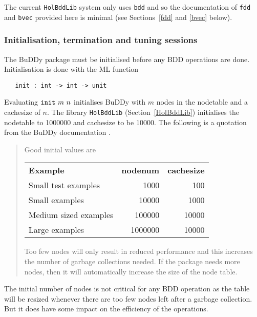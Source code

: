\documentclass[12pt]{book}
\renewcommand{\t}[1]{\mbox{\tt #1}}
\newcommand{\Buddy}{BuDDy{}}
\newcommand\HolBuddy{\texttt{HolBddLib}{}}
\begin{document}
The current \HolBuddy{} system only uses \t{bdd} and so
the documentation of \t{fdd} and \t{bvec} provided here is minimal
(see Sections~\ref{fdd} and \ref{bvec} below).

\subsubsection{Initialisation, termination and tuning sessions}\label{init}

The \Buddy{} package must be initialised before any BDD operations are done.
Initialisation is done with the ML function

\begin{verbatim}
   init : int -> int -> unit
\end{verbatim}

Evaluating $\t{init}~m~n$ initialises \Buddy{} with $m$ nodes in the
nodetable and a cachesize of $n$.  
The library \t{HolBddLib} (Section~\ref{HolBddLib}) 
initialises the nodetable to 1000000 and cachesize to
be 10000. The following is a quotation from the \Buddy{} documentation \cite{BuDDy}.

\vspace*{-2mm}

{\baselineskip8pt\begin{quote}\footnotesize
Good initial values are

\smallskip

\begin{tabular}{lrr}
{\bf Example} & {\bf nodenum} & {\bf cachesize} \\
Small test examples   & 1000    & 100\\
Small examples        & 10000   & 1000 \\
Medium sized examples & 100000  & 10000\\
Large examples        & 1000000 & 10000
\end{tabular}

\smallskip

Too few nodes will only result in reduced performance and this
increases the number of garbage collections needed. If the package
needs more nodes, then it will automatically increase the size of the
node table.
\end{quote}}

The initial number of nodes is not critical for any BDD operation
as the table will be resized whenever there are too few nodes left
after a garbage collection.  But it does have some impact on the
efficiency of the operations.
\end{document}
